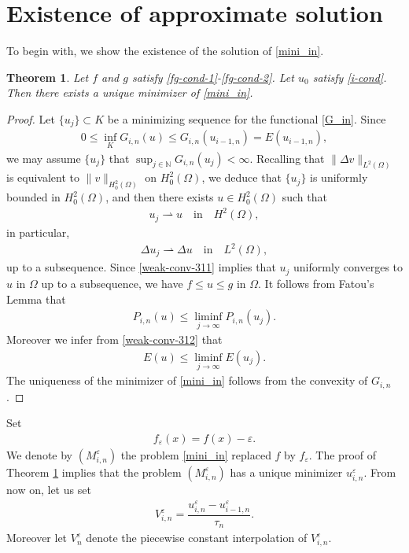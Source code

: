 \documentclass[12pt]{amsart}
\newtheorem{thm}{Theorem}[section]
\begin{document}
\section{Existence of approximate solution} \label{exist-appro-sol}

To begin with, we show the existence of the solution of \eqref{mini_in}. 

\begin{thm} \label{exist-mini}
Let $f$ and $g$ satisfy \eqref{fg-cond-1}-\eqref{fg-cond-2}.  Let $u_0$ satisfy \eqref{i-cond}. 
Then there exists a unique minimizer of \eqref{mini_in}. 
\end{thm}
\begin{proof}
Let $\{ u_{j} \} \subset K$ be a minimizing sequence for the functional \eqref{G_in}. 
Since 
\begin{align*}
0 \le \inf_{K} G_{i,n}(u) \le G_{i,n}(u_{i-1,n}) = E(u_{i-1,n}),  
\end{align*}
we may assume $\{ u_j \}$ that $\sup_{j \in {\mathbb{N}}} G_{i,n}(u_j) < \infty$. 
Recalling that $\| \Delta v \|_{L^2(\Omega)}$ is equivalent to $\| v \|_{H^2_0(\Omega)}$ 
on $H^2_0(\Omega)$,
we deduce that $\{ u_j \}$ is uniformly bounded in $H^2_0(\Omega)$, 
and then there exists $u \in H^{2}_{0}(\Omega)$ such that 
\begin{align} \label{weak-conv-311}
u_j \rightharpoonup u \quad \text{in} \quad H^2(\Omega), 
\end{align}
in particular,  
\begin{align} \label{weak-conv-312}
\Delta u_j \rightharpoonup \Delta u \quad \text{in} \quad L^2(\Omega), 
\end{align}
up to a subsequence. 
Since \eqref{weak-conv-311} implies that $u_j$ uniformly converges to $u$ in $\Omega$ up to a subsequence, 
we have $f \le u \le g$ in $\Omega$. 
It follows from Fatou's Lemma that 
\begin{align*}
P_{i,n}(u) \le \liminf_{j \to \infty} P_{i,n}(u_j). 
\end{align*}
Moreover we infer from \eqref{weak-conv-312} that 
\begin{align*}
E(u) \le \liminf_{j \to \infty} E(u_j). 
\end{align*}
The uniqueness of the minimizer of \eqref{mini_in} follows from the convexity of $G_{i,n}$. 
\end{proof}

Set 
\begin{align}
f_{\varepsilon}(x) = f(x) - {\varepsilon}. 
\end{align}
We denote by $(M^{\varepsilon}_{i,n})$ the problem \eqref{mini_in} replaced $f$ by $f_{\varepsilon}$. 
The proof of Theorem \ref{exist-mini} implies that the problem $(M^{\varepsilon}_{i,n})$ has a unique minimizer $u^{\varepsilon}_{i,n}$. 
From now on, let us set 
\begin{align}
V^{\varepsilon}_{i,n} = \dfrac{u^{\varepsilon}_{i,n} - u^{\varepsilon}_{i-1,n}}{\tau_n}. 
\end{align}
Moreover let $V^{\varepsilon}_{n}$ denote the piecewise constant interpolation of $V^{\varepsilon}_{i,n}$. 
\end{document}
